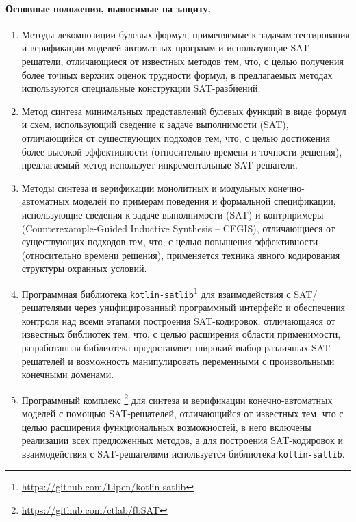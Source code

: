 %
%
\paragraph{Основные положения, выносимые на защиту.}
%
%
\begin{enumerate}[beginpenalty=10000]
    \item Методы декомпозиции булевых формул, применяемые к задачам тестирования и верификации моделей автоматных программ и использующие SAT-решатели, отличающиеся от известных методов тем, что, с целью получения более точных верхних оценок трудности формул, в предлагаемых методах используются специальные конструкции SAT-разбиений.

    \item Метод синтеза минимальных представлений булевых функций в виде формул и схем, использующий сведение к задаче выполнимости (SAT), отличающийся от существующих подходов тем, что, с целью достижения более высокой эффективности (относительно времени и точности решения), предлагаемый метод использует инкрементальные SAT-решатели.

    \item Методы синтеза и верификации монолитных и модульных конечно-автоматных моделей по примерам поведения и формальной спецификации, использующие сведения к задаче выполнимости (SAT) и контрпримеры (Counterexample-Guided Inductive Synthesis \--- CEGIS), отличающиеся от существующих подходов тем, что, с целью повышения эффективности (относительно времени решения), применяется техника явного кодирования структуры охранных условий.

    \item Программная библиотека \texttt{kotlin-satlib}\footnote{\url{https://github.com/Lipen/kotlin-satlib}} для взаимодействия с SAT\-/решателями через унифицированный программный интерфейс и обеспечения контроля над всеми этапами построения SAT-кодировок, отличающаяся от известных библиотек тем, что, с целью расширения области применимости, разработанная библиотека предоставляет широкий выбор различных SAT-решателей и возможность манипулировать переменными с произвольными конечными доменами.

    \item Программный комплекс \footnote{\url{https://github.com/ctlab/fbSAT}} для синтеза и верификации конечно-автоматных моделей с помощью SAT-решателей, отличающийся от известных тем, что с целью расширения функциональных возможностей, в него включены реализации всех предложенных методов, а для построения SAT-кодировок и взаимодействия с SAT-решателями используется библиотека \texttt{kotlin-satlib}.
\end{enumerate}


